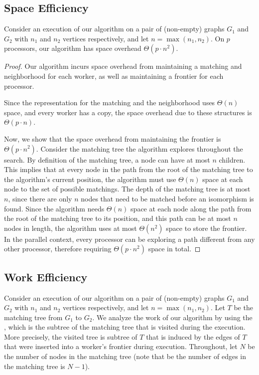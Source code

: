 \subsection{Space Efficiency}
\begin{theorem}\label{thm:space-efficiency}
  Consider an execution of our algorithm on a pair of (non-empty) graphs
  $G_1$ and $G_2$ with $n_1$ and $n_2$ vertices respectively, and let $n
  = \max(n_1, n_2)$.
  On $p$ processors, our algorithm has space overhead $\Theta(p \cdot n^2)$.
\end{theorem}

\begin{proof}
  Our algorithm incurs space overhead from maintaining
  a matching and neighborhood for each worker, as well
  as maintaining a frontier for each processor.

  Since the representation for the matching and the neighborhood
  uses $\Theta(n)$ space, and every worker has a copy,
  the space overhead due to these structures is $\Theta(p \cdot n)$.

  Now, we show that the space overhead from maintaining the frontier
  is $\Theta(p \cdot n^2)$.
  Consider the matching tree the algorithm explores throughout
  the search.
  By definition of the matching tree, a node can have at most
  $n$ children.
  This implies that at every node in the path from the root
  of the matching tree to the algorithm's current position, the
  algorithm must use $\Theta(n)$ space at each node to the set of possible
  matchings.
  The depth of the matching tree is at most $n$, since
  there are only $n$ nodes that need to be matched before an
  isomorphism is found.
  Since the algorithm needs $\Theta(n)$ space at each node along the path
  from the root of the matching tree to its position, and this
  path can be at most $n$ nodes in length, the algorithm
  uses at most $\Theta(n^2)$ space to store the frontier.
  In the parallel context, every processor can be exploring a path different
  from any other processor, therefore requiring $\Theta(p \cdot n^2)$ space in total.
\end{proof}

\subsection{Work Efficiency}
Consider an execution of our algorithm on a pair of (non-empty) graphs
$G_1$ and $G_2$ with $n_1$ and $n_2$ vertices respectively, and let $n
= \max(n_1, n_2)$.
%
Let $T$ be the matching tree from $G_1$  to $G_2$.
%
We analyze the work of our algorithm by using the ,
which is the subtree of the matching tree that is visited during the
execution.
%
More precisely, the visited tree is subtree of $T$ that is induced by
the edges of $T$ that were inserted into a worker's frontier during
execution.
%
Throughout, let $N$ be the number of nodes in the matching tree (note
that be the number of edges in the matching tree is $N-1$).


